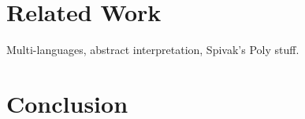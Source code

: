 \documentclass[sigplan,10pt,authordraft]{acmart}
\begin{document}
\section{Related Work}

Multi-languages,
abstract interpretation,
Spivak's Poly stuff.

\section{Conclusion}




\newpage
\appendix

%
%
%
%
%
%
%
\end{document}
